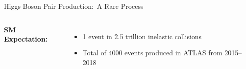 \documentclass[11pt, xcolor={dvipsnames}, aspectratio=169]{beamer}
\begin{document}
\begin{frame}{Higgs Boson Pair Production:\ A Rare Process}
\begin{columns}

    \textbf{SM Expectation:}
    \vspace{0.5em}
    \begin{itemize}
      \setlength{\itemsep}{1em}

    \item 1 \HH event in 2.5 trillion inelastic collisions

    \item Total of 4000 \HH events produced in ATLAS from 2015--2018


    \end{itemize}
  \end{columns}
\end{frame}

\end{document}
